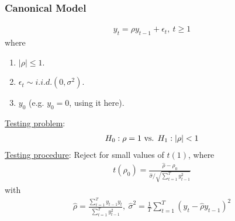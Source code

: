 \documentclass[11pt]{elegantbook}
\begin{document}
\subsubsection*{Canonical Model}
\begin{equation}
    \begin{aligned}
        y_t=\rho y_{t-1}+\epsilon_t,\ t\geq 1
    \end{aligned}
    \nonumber
\end{equation}
where
\begin{enumerate}
    \item $|\rho|\leq 1$.
    \item $\epsilon_t\sim{i.i.d.}(0,\sigma^2)$.
    \item $y_0$ (e.g. $y_0=0$, using it here).
\end{enumerate}
\underline{Testing problem}:
\begin{equation}
    \begin{aligned}
        H_0: \rho=1 \textnormal{ vs. } H_1: |\rho|<1
    \end{aligned}
    \nonumber
\end{equation}
\underline{Testing procedure}:
Reject for small values of $t(1)$, where
\begin{equation}
    \begin{aligned}
        t(\rho_0)=\frac{\hat{\rho}-\rho_0}{\hat{\sigma}/\sqrt{\sum_{t=1}^Ty_{t-1}^2}}
    \end{aligned}
    \nonumber
\end{equation}
with
\begin{equation}
    \begin{aligned}
        \hat{\rho}=\frac{\sum_{t=1}^Ty_{t-1}y_t}{\sum_{t=1}^Ty_{t-1}^2},\ \hat{\sigma}^2=\frac{1}{T}\sum_{t=1}^T(y_t-\hat{\rho}y_{t-1})^2
    \end{aligned}
    \nonumber
\end{equation}






























\appendix

\end{document}
